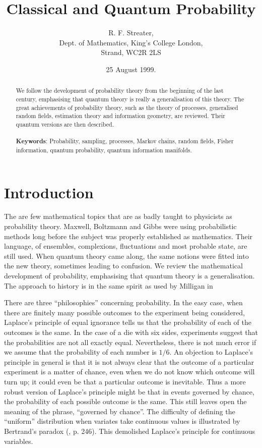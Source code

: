 \documentclass[12pt]{article}
\title{Classical and Quantum Probability}
\author{R. F. Streater,\\Dept. of Mathematics,
King's College London,\\ Strand, WC2R 2LS}
\date{25 August 1999.}
\begin{document}
\maketitle
\begin{abstract}
We follow the development of probability theory from the beginning
of the last century, emphasising that quantum theory is really a
generalisation of
this theory. The great achievements of probability theory, such as
the theory of processes, generalised random fields, estimation
theory and information geometry, are reviewed. Their quantum versions
are then described.\\
\\
{\bf Keywords}: Probability, sampling, processes, Markov chains, random fields,
Fisher information, quantum probability, quantum information manifolds.
\end{abstract}
\thispagestyle{empty}
\newpage

\section{Introduction}
The are few mathematical topics that are as badly taught to physicists
as probability theory. Maxwell, Boltzmann and Gibbs were using probabilistic
methods long before the subject was properly established as mathematics.
Their language, of ensembles,
complexions, fluctuations and most probable state, are still used. When
quantum theory came along, the same notions were fitted into the new theory,
sometimes leading to confusion. We review the mathematical development
of probability, emphasising that quantum theory is a generalisation. The
approach to history is in the same spirit as used by Milligan in
\cite{Milligan}

There are three ``philosophies'' concerning probability. 
In the easy case, when there are finitely many possible outcomes to the
experiment being considered, 
Laplace's principle of equal ignorance tells us
that the probability of each of the outcomes is the same. In the case of a
die with six sides, experiments suggest that the probabilities are not all
exactly equal. Nevertheless, there is
not much error if we assume that the probability of each number is $1/6$.
An objection to Laplace's principle in general is that it is
not always clear that the outcome of a particular experiment is a matter
of chance, even when we do not know which outcome
will turn up; it could even be that a particular outcome is inevitable. Thus
a more robust version of Laplace's principle might be that in events
governed by chance, the probability of each possible outcome is the same.
This still leaves open the meaning of the phrase, ``governed by chance''.
The difficulty of defining the ``uniform'' distribution when variates take
continuous values is illustrated by Bertrand's paradox (\cite{Decker},
p. 246). This demolished Laplace's principle for continuous variables.
\end{document}
